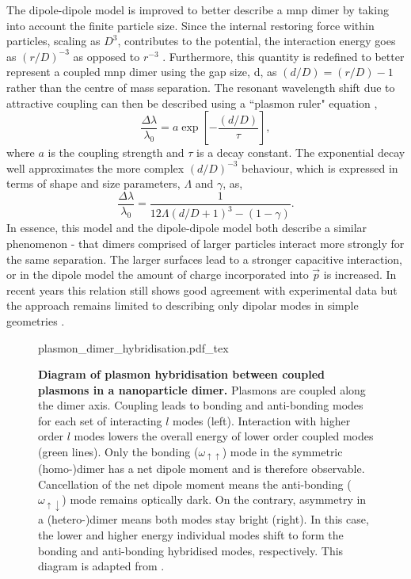 \documentclass{article}
\begin{document}
The dipole-dipole model is improved to better describe a \gls{mnp} dimer by taking into account the finite particle size. Since the internal restoring force within particles, scaling as $D^3$, contributes to the potential, the interaction energy goes as $(r/D)^{-3}$ as opposed to $r^{-3}$ \cite{jain2007}. Furthermore, this quantity is redefined to better represent a coupled \gls{mnp} dimer using the gap size, \gls{d}, as $(d/D) = (r/D)-1$ rather than the centre of mass separation. The resonant wavelength shift due to attractive coupling can then be described using a ``plasmon ruler" equation \cite{jain2007, ben2011},
\begin{equation}
	\frac{\Delta\lambda}{\lambda_0} = a\exp{\left[-\frac{(d/D)}{\tau}\right]},
	\label{eq:plasmon_ruler}
\end{equation}
where $a$ is the coupling strength and $\tau$ is a decay constant. The exponential decay well approximates the more complex $(d/D)^{-3}$ behaviour, which is expressed in terms of shape and size parameters, $\Lambda$ and $\gamma$, as,
\begin{equation}
	\frac{\Delta\lambda}{\lambda_0} = \frac{1}{12\Lambda(d/D+1)^3 - (1-\gamma)}.
\end{equation}
In essence, this model and the dipole-dipole model both describe a similar phenomenon - that dimers comprised of larger particles interact more strongly for the same separation. The larger surfaces lead to a stronger capacitive interaction, or in the dipole model the amount of charge incorporated into $\vec{p}$ is increased. In recent years this relation still shows good agreement with experimental data but the approach remains limited to describing only dipolar modes in simple geometries \cite{muskens2007}. %

\begin{figure}[bt]
\centering
\fontsize{10pt}{1em}\selectfont
\def\svgwidth{0.98\textwidth}
{plasmon_dimer_hybridisation.pdf_tex}
\caption[Diagram of plasmon hybridisation between coupled plasmons in a nanoparticle dimer]{\textbf{Diagram of plasmon hybridisation between coupled plasmons in a nanoparticle dimer.} Plasmons are coupled along the dimer axis. Coupling leads to bonding and anti-bonding modes for each set of interacting $l$ modes (left). Interaction with higher order $l$ modes lowers the overall energy of lower order coupled modes (green lines). Only the bonding ($\omega_{\uparrow\uparrow}$) mode in the symmetric (homo-)dimer has a net dipole moment and is therefore observable. Cancellation of the net dipole moment means the anti-bonding ($\omega_{\uparrow\downarrow}$) mode remains optically dark. On the contrary, asymmetry in a (hetero-)dimer means both modes stay bright (right). In this case, the lower and higher energy individual modes shift to form the bonding and anti-bonding hybridised modes, respectively. This diagram is adapted from \cite{nordlander2004}.}
\label{fig:plasmon_hybridisation}
\end{figure}
\end{document}
